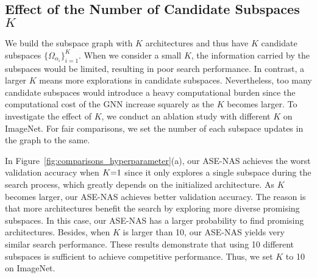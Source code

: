\documentclass[lettersize,journal]{IEEEtran}
\newcommand{\sexyname}{ASE-NAS\xspace}
\begin{document}
\begin{figure*}[!t]
\centering
{}
\hfil
{}
\caption{Comparisons of the search performance with different reward functions(a) and with/without subspace graph(b) in MobileNet-like search space on ImageNet.}
\label{fig:comparisons_with_rewards_subgraph}
\end{figure*}

\begin{figure*}[!t]
\centering
{}
\hfil
{}
\caption{Comparisons of the search performance with the different numbers of candidate subspaces $K$ (a) and the different local search distance $M$ (b) on ImageNet.}
\label{fig:comparisons_hyperparameter}
\end{figure*}


\subsection{Effect of the Number of Candidate Subspaces $K$}\label{sec:ablation_on_K}

We build the subspace graph with $K$ architectures and thus have $K$ candidate subspaces $\{\Omega_{\alpha_i}\}_{i=1}^K$.
When we consider a small $K$, the information carried by the subspaces would be limited, resulting in poor search performance.
In contrast, a larger $K$ means more explorations in candidate subspaces.
Nevertheless, too many candidate subspaces would introduce a heavy computational burden since the computational cost of the GNN increase squarely as the $K$ becomes larger.
To investigate the effect of $K$, we conduct an ablation study with different $K$ on ImageNet.
For fair comparisons, we set the number of each subspace updates in the graph to the same.

In Figure~\ref{fig:comparisons_hyperparameter}(a), our \sexyname achieves the worst validation accuracy when $K\small{=}1$ since it only explores a single subspace during the search process, which greatly depends on the initialized architecture.
As $K$ becomes larger, our \sexyname achieves better validation accuracy.
The reason is that more architectures benefit the search by exploring more diverse promising subspaces.
In this case, our \sexyname has a larger probability to find promising architectures.
Besides, when $K$ is larger than 10, our \sexyname yields very similar search performance.
These results demonstrate that using 10 different subspaces is sufficient to achieve competitive performance.
Thus, we set $K$ to 10 on ImageNet.
\end{document}
